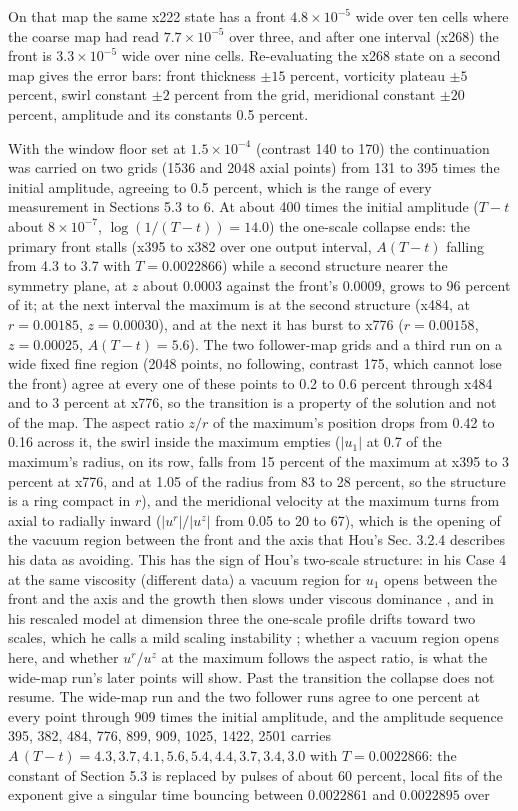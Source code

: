 \documentclass[11pt]{article}
\newcommand{\sn}[2]{#1\times 10^{#2}}
\begin{document}
On that map the same x222 state has a front $\sn{4.8}{-5}$ wide over ten cells where the coarse map had read $\sn{7.7}{-5}$ over three, and after one interval (x268) the front is $\sn{3.3}{-5}$ wide over nine cells. Re-evaluating the x268 state on a second map gives the error bars: front thickness $\pm 15$ percent, vorticity plateau $\pm 5$ percent, swirl constant $\pm 2$ percent from the grid, meridional constant $\pm 20$ percent, amplitude and its constants 0.5 percent.

With the window floor set at $\sn{1.5}{-4}$ (contrast 140 to 170) the continuation was carried on two grids (1536 and 2048 axial points) from 131 to 395 times the initial amplitude, agreeing to 0.5 percent, which is the range of every measurement in Sections 5.3 to 6. At about 400 times the initial amplitude ($T - t$ about $\sn{8}{-7}$, $\log(1/(T - t)) = 14.0$) the one-scale collapse ends: the primary front stalls (x395 to x382 over one output interval, $A(T - t)$ falling from 4.3 to 3.7 with $T = 0.0022866$) while a second structure nearer the symmetry plane, at $z$ about 0.0003 against the front's 0.0009, grows to 96 percent of it; at the next interval the maximum is at the second structure (x484, at $r = 0.00185$, $z = 0.00030$), and at the next it has burst to x776 ($r = 0.00158$, $z = 0.00025$, $A(T - t) = 5.6$). The two follower-map grids and a third run on a wide fixed fine region (2048 points, no following, contrast 175, which cannot lose the front) agree at every one of these points to 0.2 to 0.6 percent through x484 and to 3 percent at x776, so the transition is a property of the solution and not of the map. The aspect ratio $z/r$ of the maximum's position drops from 0.42 to 0.16 across it, the swirl inside the maximum empties ($|u_1|$ at 0.7 of the maximum's radius, on its row, falls from 15 percent of the maximum at x395 to 3 percent at x776, and at 1.05 of the radius from 83 to 28 percent, so the structure is a ring compact in $r$), and the meridional velocity at the maximum turns from axial to radially inward ($|u^r|/|u^z|$ from 0.05 to 20 to 67), which is the opening of the vacuum region between the front and the axis that Hou's Sec. 3.2.4 describes his data as avoiding. This has the sign of Hou's two-scale structure: in his Case 4 at the same viscosity (different data) a vacuum region for $u_1$ opens between the front and the axis and the growth then slows under viscous dominance \cite[Secs. 1.3, 3.2.4 and 3.6]{H23b}, and in his rescaled model at dimension three the one-scale profile drifts toward two scales, which he calls a mild scaling instability \cite[Secs. 1 and 5]{H24}; whether a vacuum region opens here, and whether $u^r / u^z$ at the maximum follows the aspect ratio, is what the wide-map run's later points will show. Past the transition the collapse does not resume. The wide-map run and the two follower runs agree to one percent at every point through 909 times the initial amplitude, and the amplitude sequence 395, 382, 484, 776, 899, 909, 1025, 1422, 2501 carries $A\,(T - t) = 4.3, 3.7, 4.1, 5.6, 5.4, 4.4, 3.7, 3.4, 3.0$ with $T = 0.0022866$: the constant of Section 5.3 is replaced by pulses of about 60 percent, local fits of the exponent give a singular time bouncing between $0.0022861$ and $0.0022895$ over 
\end{document}
